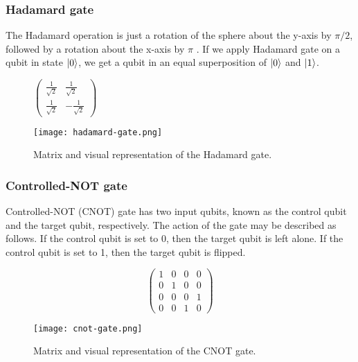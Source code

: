 \subsubsection{Hadamard gate}
The Hadamard operation is just a rotation of the sphere about the y-axis by $\pi/2$, followed by a rotation about the x-axis by $\pi$ \cite{qc}. If we apply Hadamard gate on a qubit in state $\lvert0\rangle$, we get a qubit in an equal superposition of $\lvert0\rangle$ and $\lvert1\rangle$.
\begin{figure}[H]
    \centering
    \begin{minipage}{0.4\linewidth}
      \centering
      $\begin{pmatrix} 
        \frac{1}{\sqrt{2}} &  \frac{1}{\sqrt{2}}  \\
        \frac{1}{\sqrt{2}}  &  -\frac{1}{\sqrt{2}} 
        \end{pmatrix}$
      \vfill
    \end{minipage}
    \begin{minipage}{0.25\linewidth}
      \centering
      \texttt{[image: hadamard-gate.png]}
      \vfill
    \end{minipage}
    \caption{Matrix and visual representation of the Hadamard gate.}
\end{figure}

\subsubsection{Controlled-NOT gate} 
Controlled-NOT (CNOT) gate has two input qubits, known as the control qubit and the target qubit, respectively. The action of the gate may be described as follows. If the control qubit is set to 0, then the target qubit is left alone. If the control qubit is set to 1, then the target qubit is flipped. \cite{qc}

\begin{figure}[H]
  \centering
  \begin{minipage}{0.4\linewidth}
    \centering
    $$\begin{pmatrix}
      1 & 0 & 0 & 0 \\
      0 & 1 & 0 & 0 \\
      0 & 0 & 0 & 1 \\
      0 & 0 & 1 & 0
  \end{pmatrix}$$
    \vfill
  \end{minipage}
  \begin{minipage}{0.25\linewidth}
    \centering
    \texttt{[image: cnot-gate.png]}
    \vfill
  \end{minipage}
  \caption{Matrix and visual representation of the CNOT gate.}
\end{figure}

